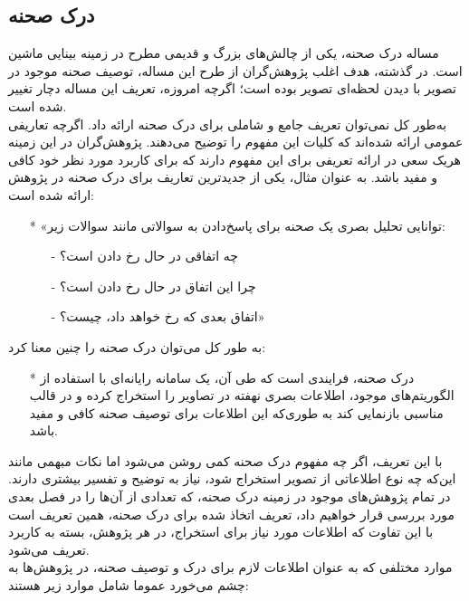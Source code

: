 \subsection{درک صحنه}
مساله درک صحنه، یکی از چالش‌های بزرگ و قدیمی مطرح در زمینه بینایی ماشین است. در گذشته، هدف اغلب پژوهش‌گران از طرح این مساله، توصیف صحنه موجود در تصویر با دیدن لحظه‌ای تصویر بوده است؛ اگر‌چه امروزه، تعریف این مساله دچار تغییر شده است.
\\
به‌طور کل نمی‌توان تعریف جامع و شاملی برای درک صحنه ارائه داد. اگرچه تعاریفی عمومی ارائه شده‌اند که کلیات این مفهوم را توضیح می‌دهند. پژوهش‌‌گران در این زمینه هریک سعی در ارائه تعریفی برای این مفهوم دارند که برای کاربرد مورد نظر خود کافی و مفید باشد. به عنوان مثال، یکی از جدیدترین تعاریف برای درک صحنه در پژوهش\cite{hoiem2015guest} ارائه شده است:

\begin{enumerate}
\item [*]
«توانایی تحلیل بصری یک صحنه برای پاسخ‌دادن به سوالاتی مانند سوالات زیر:
\begin{itemize}
\item[-] چه اتفاقی در حال رخ دادن است؟
\item[-] چرا این اتفاق در حال رخ دادن است؟
\item[-] اتفاق بعدی که رخ خواهد داد، چیست؟»
\end{itemize}

\end{enumerate}

به طور کل می‌توان درک صحنه را چنین معنا کرد:
\\
\begin{enumerate}
\item [*]
درک صحنه، فرایندی است که طی آن، یک سامانه رایانه‌ای با استفاده از الگوریتم‌های موجود، اطلاعات بصری نهفته در تصاویر را استخراج کرده و در قالب مناسبی بازنمایی کند به طوری‌که این اطلاعات برای توصیف صحنه کافی و مفید باشد.
\end{enumerate}

با این تعریف، اگر چه مفهوم درک صحنه کمی روشن می‌شود اما نکات مبهمی مانند این‌که چه نوع اطلاعاتی از تصویر استخراج شود، نیاز به توضیح و تفسیر بیشتری دارند. در تمام پژوهش‌های موجود در زمینه درک صحنه، که تعدادی از آن‌ها را در فصل بعدی مورد بررسی قرار خواهیم داد، تعریف اتخاذ شده برای درک صحنه، همین تعریف است با این تفاوت که اطلاعات مورد نیاز برای استخراج، در هر پژوهش، بسته به کاربرد تعریف می‌شود.
\\
موارد مختلفی که به عنوان اطلاعات لازم برای درک و توصیف صحنه، در پژوهش‌ها به چشم می‌خورد عموما شامل موارد زیر هستند:

